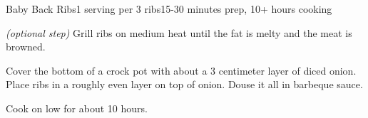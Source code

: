 \documentclass[../Cookbook.tex]{subfiles}
\begin{document}
\begin{recipe}{Baby Back Ribs}{1 serving per 3 ribs}{15-30 minutes prep, 10+ hours cooking}

\textit{(optional step)} Grill ribs on medium heat until the fat is melty and the meat is browned.

Cover the bottom of a crock pot with about a 3 centimeter layer of diced onion. Place ribs in a roughly even layer on top of onion. Douse it all in barbeque sauce.

\newstep
Cook on low for about 10 hours.

\end{recipe}
\end{document}
